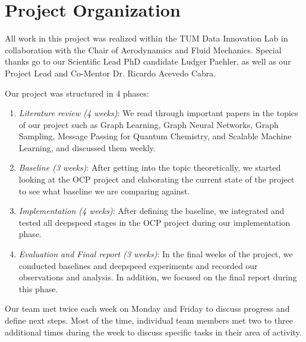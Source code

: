 \section{Project Organization}
\label{section:project_organization}

All work in this project was realized within the TUM Data Innovation Lab in collaboration with the Chair of 
Aerodynamics and Fluid Mechanics. Special thanks go to our Scientific Lead PhD candidate Ludger Paehler, 
as well as our Project Lead and Co-Mentor Dr. Ricardo Acevedo Cabra.

Our project was structured in 4 phases:

\begin{enumerate}
    \item \textit{Literature review (4 weeks)}: We read through important papers in the topics of our project such 
    as Graph Learning, Graph Neural Networks, Graph Sampling, Message Passing for Quantum Chemistry, 
    and Scalable Machine Learning, and discussed them weekly.
    \item \textit{Baseline (3 weeks)}: After getting into the topic theoretically, we started looking at the OCP 
    project and elaborating the current state of the project to see what baseline we are comparing against.
    \item \textit{Implementation (4 weeks)}: After defining the baseline, we integrated and tested all deepspeed 
    stages in the OCP project during our implementation phase.
    \item \textit{Evaluation and Final report (3 weeks)}: In the final weeks of the project, we conducted baselines 
    and deepspeed experiments and recorded our observations and analysis. In addition, we focused on the final 
    report during this phase.
\end{enumerate}

Our team met twice each week on Monday and Friday to discuss progress and define next steps. Most of 
the time, individual team members met two to three additional times during the week to discuss specific 
tasks in their area of activity. 